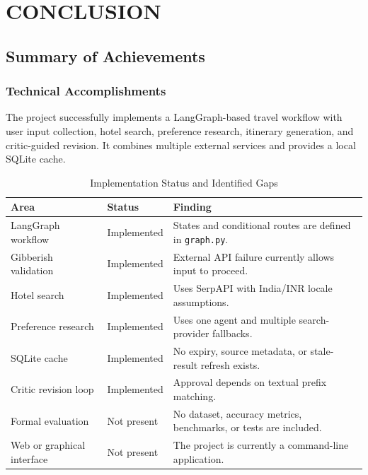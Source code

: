 \documentclass[12pt,a4paper]{report}
\begin{document}
\chapter{CONCLUSION}
\label{ch:conclusion}

\section{Summary of Achievements}
\label{sec:summary-achievements}

\subsection{Technical Accomplishments}
\label{subsec:technical-accomplishments}
The project successfully implements a LangGraph-based travel workflow with user input collection,
hotel search, preference research, itinerary generation, and critic-guided revision. It combines
multiple external services and provides a local SQLite cache.

\begin{table}[htbp]
\centering
\caption{Implementation Status and Identified Gaps}
\label{tab:implementation-status}
\begin{tabularx}{\textwidth}{|>{\raggedright\arraybackslash}p{4.5cm}|>{\centering\arraybackslash}p{2.5cm}|X|}
\hline
\textbf{Area} & \textbf{Status} & \textbf{Finding} \\
\hline
LangGraph workflow & Implemented & States and conditional routes are defined in \texttt{graph.py}. \\
\hline
Gibberish validation & Implemented & External API failure currently allows input to proceed. \\
\hline
Hotel search & Implemented & Uses SerpAPI with India/INR locale assumptions. \\
\hline
Preference research & Implemented & Uses one agent and multiple search-provider fallbacks. \\
\hline
SQLite cache & Implemented & No expiry, source metadata, or stale-result refresh exists. \\
\hline
Critic revision loop & Implemented & Approval depends on textual prefix matching. \\
\hline
Formal evaluation & Not present & No dataset, accuracy metrics, benchmarks, or tests are included. \\
\hline
Web or graphical interface & Not present & The project is currently a command-line application. \\
\hline
\end{tabularx}
\end{table}
\end{document}
